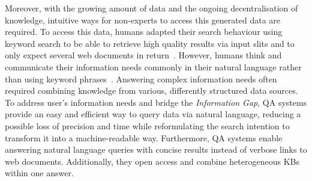 Moreover, with the growing amount of data and the ongoing decentralisation of knowledge, intuitive ways for non-experts to access this generated data are required. 
To access this data, humans adapted their search behaviour using keyword search to be able to retrieve high quality results via input slits and to only expect several web documents in return~\cite{ilprints361}.
However, humans think and communicate their information needs commonly in their natural language rather than using keyword phrases~\cite{woods1973progress}. 
Answering complex information needs often required combining knowledge from various, differently structured data sources.
To address user's information needs and bridge the \emph{Information Gap}, \ac{QA} systems provide an easy and efficient way to query data via natural language, reducing a possible loss of precision and time while reformulating the search intention to transform it into a machine-readable way.
Furthermore, QA systems enable answering natural language queries with concise results instead of verbose links to web documents. 
Additionally, they open access and combine heterogeneous \ac{KB}s within one answer.


